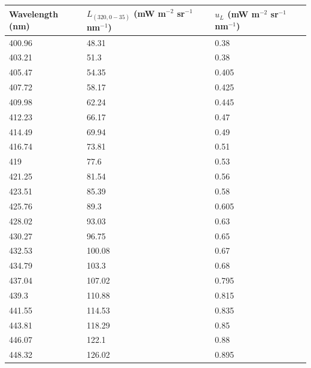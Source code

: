 \documentclass[nohyper,nobib]{tufte-book}
\begin{document}
\begin{table}[]
\centering
\begin{tabular}{@{}lll@{}}
\toprule
Wavelength (nm) & $L_{(320,0-35)}$ (mW m$^{-2}$ sr$^{-1}$ nm$^{-1}$) & $u_{L}$ (mW m$^{-2}$ sr$^{-1}$ nm$^{-1}$) \\ \midrule
400.96          & 48.31             & 0.38              \\
403.21          & 51.3              & 0.38              \\
405.47          & 54.35             & 0.405             \\
407.72          & 58.17             & 0.425             \\
409.98          & 62.24             & 0.445             \\
412.23          & 66.17             & 0.47              \\
414.49          & 69.94             & 0.49              \\
416.74          & 73.81             & 0.51              \\
419             & 77.6              & 0.53              \\
421.25          & 81.54             & 0.56              \\
423.51          & 85.39             & 0.58              \\
425.76          & 89.3              & 0.605             \\
428.02          & 93.03             & 0.63              \\
430.27          & 96.75             & 0.65              \\
432.53          & 100.08            & 0.67              \\
434.79          & 103.3             & 0.68              \\
437.04          & 107.02            & 0.795             \\
439.3           & 110.88            & 0.815             \\
441.55          & 114.53            & 0.835             \\
443.81          & 118.29            & 0.85              \\
446.07          & 122.1             & 0.88              \\
448.32          & 126.02            & 0.895             \\

\end{tabular}
\end{table}
\end{document}

